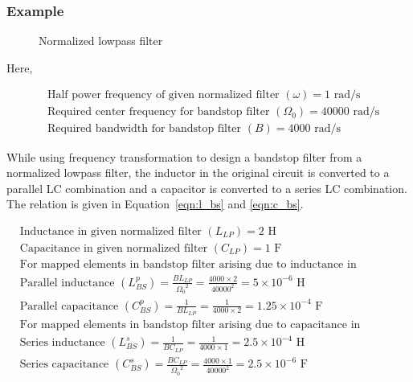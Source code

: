 \subsubsection*{Example}
\begin{figure}[H]
    \centering
    \figquestion
    \caption{Normalized lowpass filter}
    \label{fig:figd}
 \end{figure}
Here,
\begin{fleqn}[\parindent]
   \begin{equation*}
      \begin{split}
         &\text{Half power frequency of given normalized filter } (\omega)=1 \text{ rad/s}\\
         &\text{Required center frequency for bandstop filter }(\Omega_0)=40000 \text{ rad/s} \\
         &\text{Required bandwidth for bandstop filter }(B)=4000 \text{ rad/s}
         \end{split}
      \end{equation*}
\end{fleqn}
While using frequency transformation to design a bandstop filter from a normalized lowpass filter, the inductor in the original circuit is converted to a parallel LC combination and a capacitor is converted to a series LC combination. The relation is given in Equation~\ref{eqn:l_bs} and \ref{eqn:c_bs}.
\begin{fleqn}[\parindent]
   \begin{equation*}
      \begin{split}
         &\text{Inductance in given normalized filter } (L_{LP})=2 \text{ H}\\
         &\text{Capacitance in given normalized filter } (C_{LP})=1 \text{ F}\\
         &\text{For mapped elements in bandstop filter arising due to inductance in normalized filter:}\\
         &\text{Parallel inductance }(L_{BS}^p)=\frac{BL_{LP}}{{\Omega_0}^2}=\frac{4000\times2}{40000^2}=5\times10^{-6}\text{ H}\\
         &\text{Parallel capacitance }(C_{BS}^p)=\frac{1}{BL_{LP}}=\frac{1}{4000\times2}=1.25\times10^{-4}\text{ F}\\
         &\text{For mapped elements in bandstop filter arising due to capacitance in normalized filter:}\\
         &\text{Series inductance }(L_{BS}^s)=\frac{1}{BC_{LP}}=\frac{1}{4000\times1}=2.5\times10^{-4}\text{ H}\\
         &\text{Series capacitance }(C_{BS}^s)=\frac{BC_{LP}}{{\Omega_0}^2}=\frac{4000\times1}{40000^2}=2.5\times10^{-6}\text{ F}\\
         \end{split}
      \end{equation*}
\end{fleqn}
